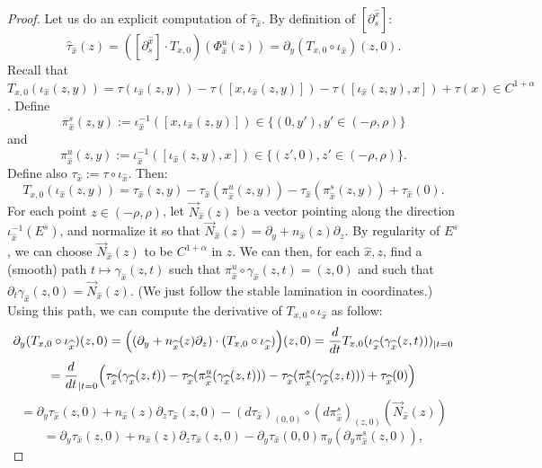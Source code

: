 \documentclass[a4paper]{article}
\theoremstyle{definition}
\begin{document}
\begin{proof}
Let us do an explicit computation of $\widehat{\tau}_{\widehat{x}}$. By definition of $[\partial_s^{\widehat{x}}]$:
$$ \widehat{\tau}_{\widehat{x}}(z) = ([\partial_s^{\widehat{x}}] \cdot T_{x,0})(\Phi_{\widehat{x}}^u(z)) = \partial_y (T_{x,0} \circ \iota_{\widehat{x}})(z,0) .$$
Recall that $T_{x,0}(\iota_{\widehat{x}}(z,y)) = \tau(\iota_{\widehat{x}}(z,y)) - \tau([x,\iota_{\widehat{x}}(z,y)])-\tau([\iota_{\widehat{x}}(z,y),x]) + \tau(x) \in C^{1+\alpha}$. Define $$\pi_{\widehat{x}}^s(z,y) := \iota_{\widehat{x}}^{-1}( [x,\iota_{\widehat{x}}(z,y)] ) \in \{ (0,y') , y' \in (-\rho,\rho) \}$$ and $$\pi_{\widehat{x}}^u(z,y) := \iota_{\widehat{x}}^{-1}( [\iota_{\widehat{x}}(z,y),x] ) \in \{ (z',0) , z' \in (-\rho,\rho) \}.$$
Define also $\tau_{\widehat{x}} := \tau \circ \iota_{\widehat{x}}$. Then:
$$ T_{x,0}(\iota_{\widehat{x}}(z,y)) = \tau_{\widehat{x}}(z,y) - \tau_{\widehat{x}}(\pi_{\widehat{x}}^u(z,y)) - \tau_{\widehat{x}}(\pi_{\widehat{x}}^s(z,y)) + \tau_{\widehat{x}}(0). $$
For each point $z \in (-\rho,\rho)$, let $\vec{N}_{\widehat{x}}(z)$ be a vector pointing along the direction $\iota_{\widehat{x}}^{-1}(E^s)$, and normalize it so that $\vec{N}_{\widehat{x}}(z) = \partial_y + n_{\widehat{x}}(z) \partial_z$. By regularity of $E^s$, we can choose $\vec{N}_{\widehat{x}}(z)$ to be $C^{1+\alpha}$ in $z$. We can then, for each ${\widehat{x}},z$, find a (smooth) path $ t \mapsto \gamma_{\widehat{x}}(z,t)$ such that $\pi_{\widehat{x}}^{u} \circ \gamma_{\widehat{x}}(z,t) = (z,0) $ and such that $\partial_t \gamma_{\widehat{x}}(z,0) = \vec{N}_{\widehat{x}}(z)$. (We just follow the stable lamination in coordinates.) Using this path, we can compute the derivative of $T_{x,0} \circ \iota_{\widehat{x}}$ as follow:
$$\partial_y (T_{x,0} \circ \iota_{\widehat{x}})(z,0) = \Big{(}(\partial_y + n_{\widehat{x}}(z) \partial_z) \cdot (T_{x,0} \circ \iota_{\widehat{x}}) \Big{)}(z,0) = \frac{d}{dt} T_{x,0}(\iota_{\widehat{x}}(\gamma_{\widehat{x}}(z,t)))_{|t=0}$$
$$ = \frac{d}{dt}_{|t=0} \Big{(} \tau_{\widehat{x}}( \gamma_{\widehat{x}}(z,t) ) - \tau_{\widehat{x}}(\pi_{\widehat{x}}^u( \gamma_{\widehat{x}}(z,t) )) - \tau_{\widehat{x}}(\pi_{\widehat{x}}^s( \gamma_{\widehat{x}}(z,t))) + \tau_{\widehat{x}}(0) \Big{)}  $$
$$ = \partial_y \tau_{\widehat{x}}(z,0) + n_{\widehat{x}}(z) \partial_z \tau_{\widehat{x}}(z,0) - (d\tau_{\widehat{x}})_{(0,0)} \circ (d\pi_{\widehat{x}}^s)_{(z,0)} ( \vec{N}_{\widehat{x}}(z) ) $$
$$ = \partial_y \tau_{\widehat{x}}(z,0) + n_{\widehat{x}}(z) \partial_z \tau_{\widehat{x}}(z,0) - \partial_y \tau_{\widehat{x}}(0,0) \pi_y( \partial_y \pi_{\widehat{x}}^s(z,0)),$$

\end{proof}
\end{document}
